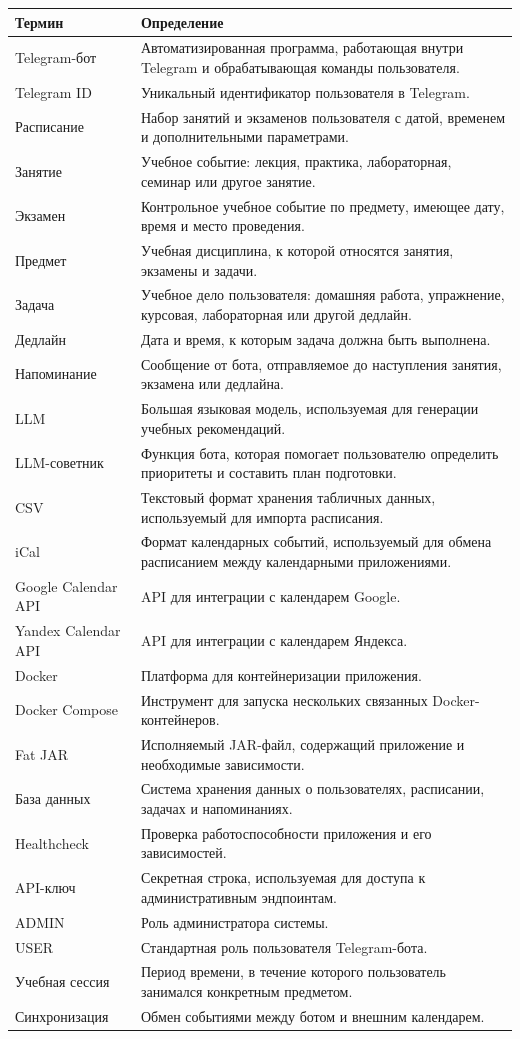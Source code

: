 \documentclass[10pt,a4paper,final]{article} %
\begin{document}
\begin{longtable}{p{}p{}}
\toprule
\textbf{Термин} & \textbf{Определение} \\
\midrule
\endhead
Telegram-бот & Автоматизированная программа, работающая внутри Telegram и обрабатывающая команды пользователя. \\
Telegram ID & Уникальный идентификатор пользователя в Telegram. \\
Расписание & Набор занятий и экзаменов пользователя с датой, временем и дополнительными параметрами. \\
Занятие & Учебное событие: лекция, практика, лабораторная, семинар или другое занятие. \\
Экзамен & Контрольное учебное событие по предмету, имеющее дату, время и место проведения. \\
Предмет & Учебная дисциплина, к которой относятся занятия, экзамены и задачи. \\
Задача & Учебное дело пользователя: домашняя работа, упражнение, курсовая, лабораторная или другой дедлайн. \\
Дедлайн & Дата и время, к которым задача должна быть выполнена. \\
Напоминание & Сообщение от бота, отправляемое до наступления занятия, экзамена или дедлайна. \\
LLM & Большая языковая модель, используемая для генерации учебных рекомендаций. \\
LLM-советник & Функция бота, которая помогает пользователю определить приоритеты и составить план подготовки. \\
CSV & Текстовый формат хранения табличных данных, используемый для импорта расписания. \\
iCal & Формат календарных событий, используемый для обмена расписанием между календарными приложениями. \\
Google Calendar API & API для интеграции с календарем Google. \\
Yandex Calendar API & API для интеграции с календарем Яндекса. \\
Docker & Платформа для контейнеризации приложения. \\
Docker Compose & Инструмент для запуска нескольких связанных Docker-контейнеров. \\
Fat JAR & Исполняемый JAR-файл, содержащий приложение и необходимые зависимости. \\
База данных & Система хранения данных о пользователях, расписании, задачах и напоминаниях. \\
Healthcheck & Проверка работоспособности приложения и его зависимостей. \\
API-ключ & Секретная строка, используемая для доступа к административным эндпоинтам. \\
ADMIN & Роль администратора системы. \\
USER & Стандартная роль пользователя Telegram-бота. \\
Учебная сессия & Период времени, в течение которого пользователь занимался конкретным предметом. \\
Синхронизация & Обмен событиями между ботом и внешним календарем. \\
\bottomrule
\end{longtable}
\end{document}
